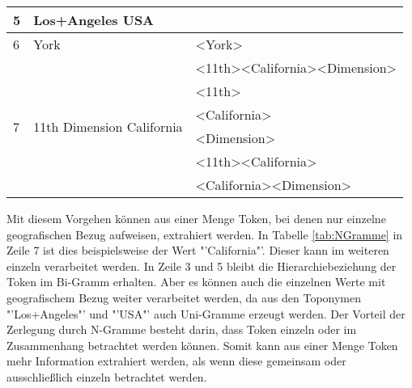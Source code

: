 \begin{table}[h]
\begin{tabular}{|l|l|l|}
					5                               & Los+Angeles USA                             &                                                                                          \\ \hline \hline
					6                               & York                                        & \textless York\textgreater                                                                \\ \hline \hline
					\multirow{6}{*}{7}              & \multirow{6}{*}{11th Dimension California}  & \textless 11th\textgreater\textless California\textgreater\textless Dimension\textgreater \\ \cline{3-3} 
					                                &                                             & \textless 11th\textgreater                                                                \\ \cline{3-3} 
					                                &                                             & \textless California\textgreater                                                         \\ \cline{3-3} 
					                                &                                             & \textless Dimension\textgreater                                                          \\ \cline{3-3} 
					                                &                                             & \textless 11th\textgreater\textless California\textgreater                                 \\ \cline{3-3} 
					                                &                                             & \textless California\textgreater\textless Dimension\textgreater                           \\ \hline
					\end{tabular}
					\end{table}

				Mit diesem Vorgehen können aus einer Menge Token, bei denen nur einzelne geografischen Bezug aufweisen, extrahiert werden.
				In Tabelle \ref{tab:NGramme} in Zeile 7 ist dies beispielsweise der Wert "'California"'. 
				Dieser kann im weiteren einzeln verarbeitet werden. 
				In Zeile 3 und 5 bleibt die Hierarchiebeziehung der Token im Bi-Gramm erhalten.
				Aber es können auch die einzelnen Werte mit geografischem Bezug weiter verarbeitet werden, da aus den Toponymen "'Los+Angeles"' und "'USA"' auch Uni-Gramme erzeugt werden.
				Der Vorteil der Zerlegung durch N-Gramme besteht darin, dass Token einzeln oder im Zusammenhang betrachtet werden können. 
				Somit kann aus einer Menge Token mehr Information extrahiert werden, als wenn diese gemeinsam oder ausschließlich einzeln betrachtet werden.

